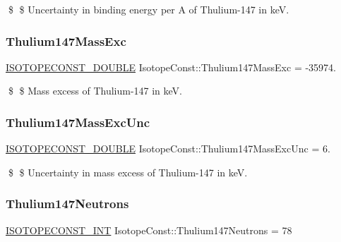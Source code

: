 \$ \$ Uncertainty in binding energy per A of Thulium-\/147 in keV. \mbox{\label{group___isotope_const-_thulium-_tm147_gacf6c85eb98052ac0b3c4ac95ce268471}} 
\subsubsection{\texorpdfstring{Thulium147\+Mass\+Exc}{Thulium147MassExc}}
{\footnotesize\ttfamily \mbox{\hyperlink{group___isotope_const-_macros_ga8f45a7272ce02c0b4c65c44636ed719a}{I\+S\+O\+T\+O\+P\+E\+C\+O\+N\+S\+T\+\_\+\+D\+O\+U\+B\+LE}} Isotope\+Const\+::\+Thulium147\+Mass\+Exc = -\/35974.}

\$ \$ Mass excess of Thulium-\/147 in keV. \mbox{\label{group___isotope_const-_thulium-_tm147_ga1e8aa7504b4655184e8a67d669b9402a}} 
\subsubsection{\texorpdfstring{Thulium147\+Mass\+Exc\+Unc}{Thulium147MassExcUnc}}
{\footnotesize\ttfamily \mbox{\hyperlink{group___isotope_const-_macros_ga8f45a7272ce02c0b4c65c44636ed719a}{I\+S\+O\+T\+O\+P\+E\+C\+O\+N\+S\+T\+\_\+\+D\+O\+U\+B\+LE}} Isotope\+Const\+::\+Thulium147\+Mass\+Exc\+Unc = 6.}

\$ \$ Uncertainty in mass excess of Thulium-\/147 in keV. \mbox{\label{group___isotope_const-_thulium-_tm147_ga6c0214205f170598cf206676424fdd1c}} 
\subsubsection{\texorpdfstring{Thulium147\+Neutrons}{Thulium147Neutrons}}
{\footnotesize\ttfamily \mbox{\hyperlink{group___isotope_const-_macros_ga5f18360b3e99483a35c32d789e62621c}{I\+S\+O\+T\+O\+P\+E\+C\+O\+N\+S\+T\+\_\+\+I\+NT}} Isotope\+Const\+::\+Thulium147\+Neutrons = 78}

